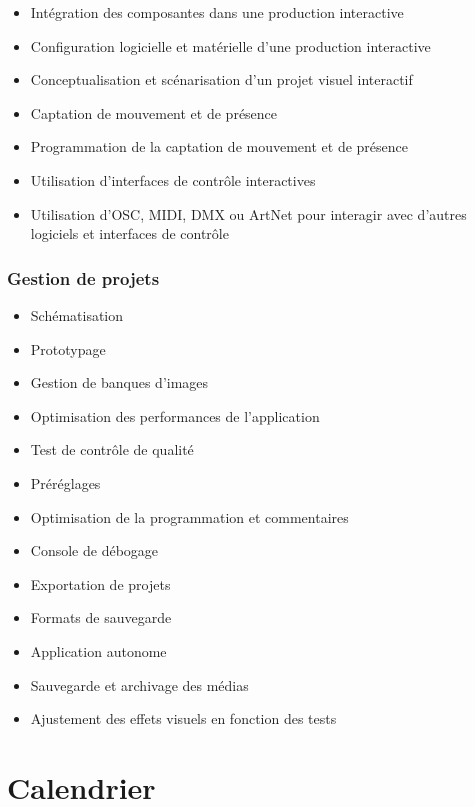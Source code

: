 \documentclass[
]{book}
\providecommand{\tightlist}{%
  \setlength{\itemsep}{0pt}\setlength{\parskip}{0pt}}
\begin{document}
\begin{itemize}
\tightlist
\item
  Intégration des composantes dans une production interactive
\item
  Configuration logicielle et matérielle d'une production interactive\\
\item
  Conceptualisation et scénarisation d'un projet visuel interactif\\
\item
  Captation de mouvement et de présence
\item
  Programmation de la captation de mouvement et de présence
\item
  Utilisation d'interfaces de contrôle interactives
\item
  Utilisation d'OSC, MIDI, DMX ou ArtNet pour interagir avec d'autres logiciels et interfaces de contrôle
\end{itemize}

\hypertarget{gestion-de-projets}{%
\subsection{Gestion de projets}\label{gestion-de-projets}}

\begin{itemize}
\tightlist
\item
  Schématisation
\item
  Prototypage
\item
  Gestion de banques d'images
\item
  Optimisation des performances de l'application
\item
  Test de contrôle de qualité
\item
  Préréglages
\item
  Optimisation de la programmation et commentaires
\item
  Console de débogage
\item
  Exportation de projets
\item
  Formats de sauvegarde\\
\item
  Application autonome
\item
  Sauvegarde et archivage des médias
\item
  Ajustement des effets visuels en fonction des tests
\end{itemize}

\hypertarget{calendrier}{%
\chapter{Calendrier}\label{calendrier}}
\end{document}
